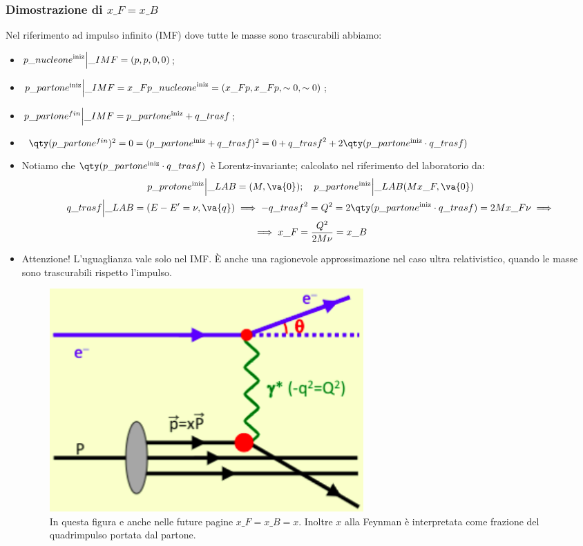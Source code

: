 \subsubsection{Dimostrazione di $x\_F=x\_B$}
Nel riferimento ad impulso infinito (IMF) dove tutte le masse sono trascurabili abbiamo:
\begin{itemize}
    \item $p\_{nucleone}^{\textnormal{iniz}}\Big|\_{IMF}=(p,p,0,0)$;
    \item $p\_{partone}^{\textnormal{iniz}}\Big|\_{IMF}=x\_F p\_{nucleone}^{\textnormal{iniz}}=(x\_Fp,x\_Fp,\sim0,\sim0)$;
    \item $p\_{partone}^{fin}\Big|\_{IMF}=p\_{partone}^{\textnormal{iniz}}+q\_{trasf}$;
    \item $\qty(p\_{partone}^{fin})^2=0=(p\_{partone}^{\textnormal{iniz}}+q\_{trasf})^2=0+q\_{trasf}^2+2\qty(p\_{partone}^{\textnormal{iniz}}\cdot q\_{trasf})$
    \item Notiamo che $\qty(p\_{partone}^{\textnormal{iniz}}\cdot q\_{trasf})$ è Lorentz-invariante; calcolato nel riferimento del laboratorio da:
    \begin{gather*}
        p\_{protone}^{\textnormal{iniz}}\Big|\_{LAB}=(M,\va{0});\quad p\_{partone}^{\textnormal{iniz}}\Big|\_{LAB}(Mx\_F,\va{0})\\
        q\_{trasf}\Big|\_{LAB}=(E-E'=\nu,\va{q})\implies -q\_{trasf}^2=Q^2=2\qty(p\_{partone}^{\textnormal{iniz}}\cdot q\_{trasf})=2Mx\_F\nu\implies\\
        \implies x\_F=\frac{Q^2}{2M\nu}=x\_B
        \end{gather*}
    \item Attenzione! L'uguaglianza vale solo nel IMF. È anche una ragionevole approssimazione nel caso ultra relativistico, quando le masse sono trascurabili rispetto l'impulso. 
    \begin{figure}[H]
        \centering
        \includegraphics[width=0.6\textwidth]{immagini/fig_x_proton_parton_e.png}
        \caption{In questa figura e anche nelle future pagine $x\_F=x\_B=x$. Inoltre $x$ alla Feynman è interpretata come frazione del quadrimpulso portata dal partone.}
    \end{figure}
\end{itemize}
